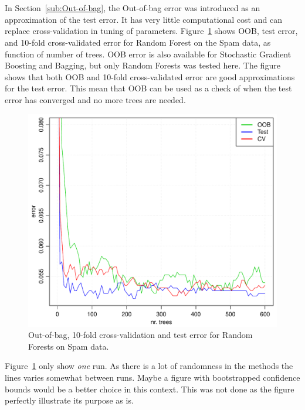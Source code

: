 \\
\\
In Section~\ref{sub:Out-of-bag}, the Out-of-bag error was introduced as an approximation of the test error. It has very little computational cost and can replace cross-validation in tuning of parameters. Figure~\ref{fig:OOBvsTestvsCV} shows OOB, test error, and 10-fold cross-validated error for Random Forest on the Spam data, as function of number of trees. 
OOB error is also available for Stochastic Gradient Boosting and Bagging, but only Random Forests was tested here.
The figure shows that both OOB and 10-fold cross-validated error are good approximations for the test error. This mean that OOB can be used as a check of when the test error has converged and no more trees are needed. 

\begin{figure}[h!]
\begin{center}
    \includegraphics[scale=0.5]{./figures/OOBvsTestvsCV.pdf}
\end{center}
\caption{Out-of-bag, 10-fold cross-validation and test error for Random Forests on Spam data.}
\label{fig:OOBvsTestvsCV}
\end{figure}

Figure~\ref{fig:OOBvsTestvsCV} only show \textit{one} run. As there is a lot of randomness in the methods the lines varies somewhat between runs. Maybe a figure with bootstrapped confidence bounds would be a better choice in this context. This was not done as the figure perfectly illustrate its purpose as is. 

